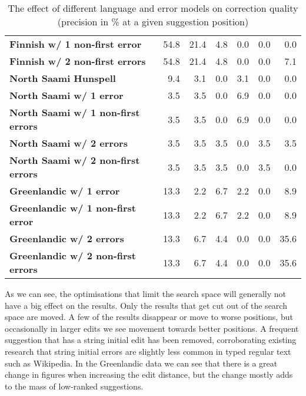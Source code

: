 \documentclass[a4paper,12pt]{article}
\begin{document}
\begin{table}
\begin{tabular}{|l|r|r|r|r|r|r|}
\bf Finnish w/ 1 non-first error & 54.8 & 21.4 & 4.8 & 0.0 & 0.0 & 0.0 \\
\bf Finnish w/ 2 non-first errors & 54.8 & 21.4 & 4.8 & 0.0 & 0.0 & 7.1 \\
        \hline
        \bf North Saami Hunspell & 9.4 & 3.1 & 0.0 & 3.1 & 0.0 & 0.0 \\
        \hline
        \bf North Saami w/ 1 error & 3.5 & 3.5 & 0.0 & 6.9 & 0.0 & 0.0 \\
        \bf North Saami w/ 1 non-first errors & 3.5 & 3.5 & 0.0 & 6.9 & 0.0 & 0.0\\
        \bf North Saami w/ 2 errors & 3.5 & 3.5 & 3.5 & 0.0 & 3.5 & 3.5 \\
        \bf North Saami w/ 2 non-first errors & 3.5 & 3.5 & 3.5 & 0.0 & 3.5 & 0.0\\
        \hline
          \bf Greenlandic w/ 1 error & 13.3 & 2.2 & 6.7 & 2.2 & 0.0 & 8.9 \\
 \bf Greenlandic w/ 1 non-first error & 13.3 & 2.2 & 6.7 & 2.2 & 0.0 & 8.9 \\
         \bf Greenlandic w/ 2 errors & 13.3 & 6.7 & 4.4 & 0.0 & 0.0 & 35.6 \\
\bf Greenlandic w/ 2 non-first errors & 13.3 & 6.7 & 4.4 & 0.0 & 0.0 & 35.6 \\
        \hline
    \end{tabular}
    \caption{The effect of different language and error models on correction
        quality (precision in \% at a given suggestion position)
    \label{table:quality}}
\end{table}

As we can see, the optimisations that limit the search space will generally not
have a big effect on the results. Only the results that get cut out of the
search space are moved. A few of the results disappear or move to worse
positions, but occasionally in larger edits we see movement towards better
positions.  A frequent suggestion that has a string initial edit has been
removed, corroborating existing research that string initial errors are
slightly less common in typed regular text such as Wikipedia.
In the Greenlandic data we can see that there is a great change in figures
when increasing the edit distance, but the change mostly adds to the mass of
low-ranked suggestions.



%
\end{document}
